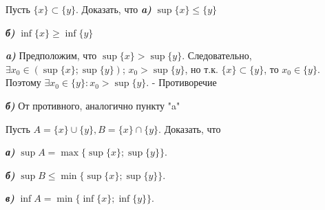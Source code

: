 \documentclass[10pt]{article}
\begin{document}
\begin{problem}

Пусть $\{x\} \subset \{y\}$. Доказать, что \newline \emph{\textbf{a)}}  $\sup\{x\} \leq\{y\}$

\medskip

\emph{\textbf{б)}} $\inf\{x\} \geq \inf\{y\}$


\end{problem}
\begin{solution}
\emph{\textbf{a)}} Предположим, что $\sup\{x\}>\sup\{y\}$. Следовательно, $\exists x_0 \in (\sup\{x\};\sup\{y\})$;
$x_0>\sup\{y\}$, но т.к. $\{x\} \subset \{y\}$, то $x_0 \in \{y\}$. Поэтому $\exists x_0 \in \{y\}: x_0>\sup\{y\}.$ - Противоречие

\medskip

\emph{\textbf{б)}}
От противного, аналогично пункту "a"
\end{solution}


\begin{problem}

Пусть $A=\{x\}\cup\{y\}, B=\{x\}\cap\{y\}$. Доказать, что

\medskip

\emph{\textbf{а)}} $\sup{A} = \max \{\sup\{x\};\sup\{y\}\}$.

\medskip

\emph{\textbf{б)}} $\sup{B} \leq \min \{\sup\{x\};\sup\{y\}\}$.

\medskip

\emph{\textbf{в)}} $\inf{A} = \min \{\inf\{x\};\inf\{y\}\}$.

\end{problem}
\end{document}
